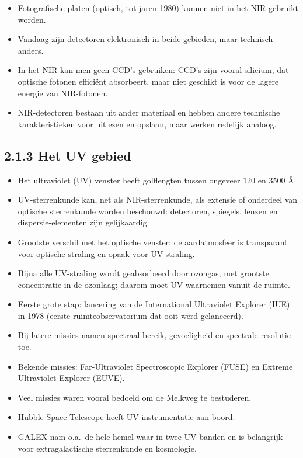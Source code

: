 \documentclass[10pt,a4paper]{article}
\begin{document}
\begin{itemize}
  \begin{itemize}
    \item Fotografische platen (optisch, tot jaren 1980) kunnen niet in het NIR gebruikt worden.
    \item Vandaag zijn detectoren elektronisch in beide gebieden, maar technisch anders.
    \item In het NIR kan men geen CCD's gebruiken: CCD's zijn vooral silicium, dat optische fotonen effici\"ent absorbeert, maar niet geschikt is voor de lagere energie van NIR-fotonen.
    \item NIR-detectoren bestaan uit ander materiaal en hebben andere technische karakteristieken voor uitlezen en opslaan, maar werken redelijk analoog.
  \end{itemize}
\end{itemize}

\subsection*{2.1.3 Het UV gebied}
\begin{itemize}
  \item Het ultraviolet (UV) venster heeft golflengten tussen ongeveer $120$ en $3500$ \AA.
  \item UV-sterrenkunde kan, net als NIR-sterrenkunde, als extensie of onderdeel van optische sterrenkunde worden beschouwd: detectoren, spiegels, lenzen en dispersie-elementen zijn gelijkaardig.
  \item Grootste verschil met het optische venster: de aardatmosfeer is transparant voor optische straling en opaak voor UV-straling.
  \item Bijna alle UV-straling wordt geabsorbeerd door ozongas, met grootste concentratie in de ozonlaag; daarom moet UV-waarnemen vanuit de ruimte.
  \item Eerste grote stap: lancering van de International Ultraviolet Explorer (IUE) in 1978 (eerste ruimteobservatorium dat ooit werd gelanceerd).
  \item Bij latere missies namen spectraal bereik, gevoeligheid en spectrale resolutie toe.
  \item Bekende missies: Far-Ultraviolet Spectroscopic Explorer (FUSE) en Extreme Ultraviolet Explorer (EUVE).
  \item Veel missies waren vooral bedoeld om de Melkweg te bestuderen.
  \item Hubble Space Telescope heeft UV-instrumentatie aan boord.
  \item GALEX nam o.a.\ de hele hemel waar in twee UV-banden en is belangrijk voor extragalactische sterrenkunde en kosmologie.
\end{itemize}
\end{document}
